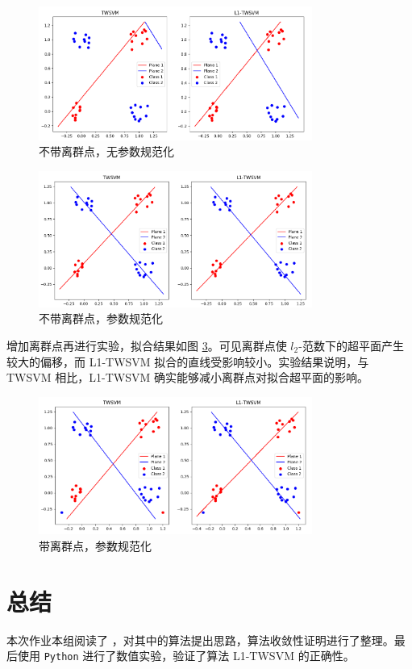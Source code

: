 \begin{figure}[ht]
\centering
\includegraphics[width=0.8\textwidth]{./img/without_norm_cons.png}
\caption{不带离群点，无参数规范化}
\label{no_out_no_reg}
\end{figure}

\begin{figure}[ht]
\centering
\includegraphics[width=0.8\textwidth]{./img/without_outliers.png}
\caption{不带离群点，参数规范化}
\label{no_out}
\end{figure}

增加离群点再进行实验，拟合结果如图 \ref{outliers}。可见离群点使 $l_2$-范数下的超平面产生较大的偏移，而 L1-TWSVM 拟合的直线受影响较小。实验结果说明，与 TWSVM 相比，L1-TWSVM 确实能够减小离群点对拟合超平面的影响。

\begin{figure}[ht]
\centering
\includegraphics[width=0.8\textwidth]{./img/with_outliers.png}
\caption{带离群点，参数规范化}
\label{outliers}
\end{figure}

\section{总结}

本次作业本组阅读了 \parencite{yan2018efficient}，对其中的算法提出思路，算法收敛性证明进行了整理。最后使用 \verb|Python| 进行了数值实验，验证了算法 L1-TWSVM 的正确性。
